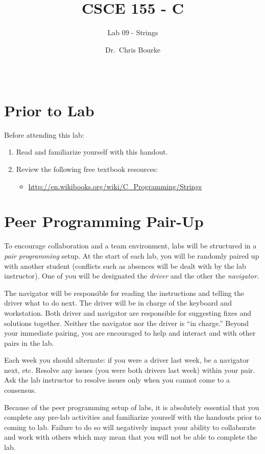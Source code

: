 \documentclass[12pt]{scrartcl}
\title{CSCE 155 - C}
\subtitle{Lab 09 - Strings}
\author{Dr.\ Chris Bourke}
\date{~}
\begin{document}
\maketitle

\section*{Prior to Lab}

Before attending this lab:
\begin{enumerate}
  \item Read and familiarize yourself with this handout.
  \item Review the following free textbook resources:
	\begin{itemize}
  	  \item \url{http://en.wikibooks.org/wiki/C_Programming/Strings }
	\end{itemize}
\end{enumerate}

\section*{Peer Programming Pair-Up}

To encourage collaboration and a team environment, labs will be
structured in a \emph{pair programming} setup.  At the start of
each lab, you will be randomly paired up with another student 
(conflicts such as absences will be dealt with by the lab instructor).
One of you will be designated the \emph{driver} and the other
the \emph{navigator}.  

The navigator will be responsible for reading the instructions and
telling the driver what to do next.  The driver will be in charge of the
keyboard and workstation.  Both driver and navigator are responsible
for suggesting fixes and solutions together.  Neither the navigator
nor the driver is ``in charge.''  Beyond your immediate pairing, you
are encouraged to help and interact and with other pairs in the lab.

Each week you should alternate: if you were a driver last week, 
be a navigator next, etc.  Resolve any issues (you were both drivers
last week) within your pair.  Ask the lab instructor to resolve issues
only when you cannot come to a consensus.  

Because of the peer programming setup of labs, it is absolutely 
essential that you complete any pre-lab activities and familiarize
yourself with the handouts prior to coming to lab.  Failure to do
so will negatively impact your ability to collaborate and work with 
others which may mean that you will not be able to complete the
lab.  
\end{document}
